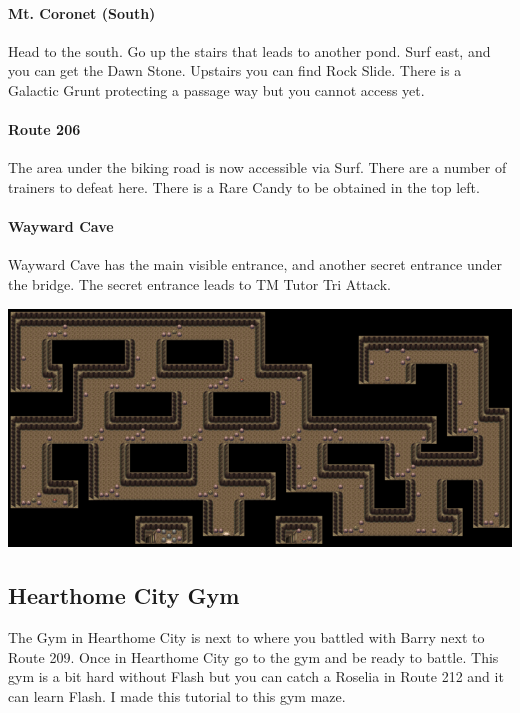 \documentclass[11pt]{article}
\begin{document}
\paragraph{Mt. Coronet (South)}
Head to the south.
Go up the stairs that leads to another pond.
Surf east, and you can get the Dawn Stone.
Upstairs you can find Rock Slide.
There is a Galactic Grunt protecting a passage way but you cannot access yet.



\paragraph{Route 206}
The area under the biking road is now accessible via Surf.
There are a number of trainers to defeat here.
There is a Rare Candy to be obtained in the top left.




\paragraph{Wayward Cave}

Wayward Cave has the main visible entrance, and another secret entrance under
the bridge.
The secret entrance leads to TM Tutor Tri Attack.

\includegraphics[width=\textwidth]{walkthrough/Sinnoh/wayward-cave}



\subsection{Hearthome City Gym}\label{subsec:hearthome-city-gym}
The Gym in Hearthome City is next to where you battled with Barry next to Route 209.
Once in Hearthome City go to the gym and be ready to battle.
This gym is a bit hard without Flash but you can catch a Roselia in Route 212
and it can learn Flash.
I made this tutorial to this gym maze.
\end{document}
